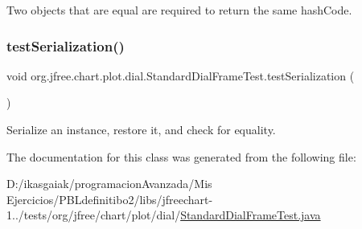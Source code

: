 Two objects that are equal are required to return the same hash\+Code. \mbox{\label{classorg_1_1jfree_1_1chart_1_1plot_1_1dial_1_1_standard_dial_frame_test_a76077dca4d6dd1c8197cc4493f745077}} 
\subsubsection{\texorpdfstring{test\+Serialization()}{testSerialization()}}
{\footnotesize\ttfamily void org.\+jfree.\+chart.\+plot.\+dial.\+Standard\+Dial\+Frame\+Test.\+test\+Serialization (\begin{DoxyParamCaption}{ }\end{DoxyParamCaption})}

Serialize an instance, restore it, and check for equality. 

The documentation for this class was generated from the following file\+:\begin{DoxyCompactItemize}
\item 
D\+:/ikasgaiak/programacion\+Avanzada/\+Mis Ejercicios/\+P\+B\+Ldefinitibo2/libs/jfreechart-\/1../tests/org/jfree/chart/plot/dial/\mbox{\hyperlink{_standard_dial_frame_test_8java}{Standard\+Dial\+Frame\+Test.\+java}}\end{DoxyCompactItemize}
